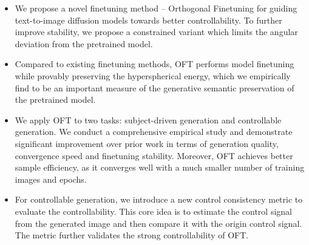 \begin{itemize}[leftmargin=*,nosep]
Both tasks essentially boil down to how to effectively finetune text-to-image diffusion models without losing the pretraining generative performance. We summarize the desiderata for an effective finetuning method as: (1) \emph{training efficiency}: having fewer trainable parameters and number of training epochs, and (2) \emph{generalizability preservation}: preserving the high-fidelity and diverse generative performance. To this end, finetuning is typically done either by updating the neuron weights by a small learning rate (\emph{e.g.}, \cite{ruiz2023dreambooth}) or by adding a small component with re-parameterized neuron weights (\emph{e.g.}, \cite{hulora2022,zhang2023adding}). Despite simplicity, neither finetuning strategy is able to guarantee the preservation of pretraining generative performance. There is also a lack of principled understanding towards designing a good finetuning strategy and finding suitable hyperparameters such as the number of training epochs. A key difficulty is the lack of a measure for quantifying the preservation of pretrained generative ability. Existing finetuning methods implicitly assume that a smaller Euclidean distance between the finetuned model and the pretrained model indicates better preservation of the pretrained ability. Due to the same reason, finetuning methods typically work with a very small learning rate. While this assumption may occasionally hold, we argue that the Euclidean difference to the pretrained model alone is unable to fully capture the degree of semantic preservation, and therefore a more structural measure to characterize the difference between the finetuned model and the pretrained model can greatly benefit the preservation of pretraining performance as well as finetuning stability. 

    \item We propose a novel finetuning method -- Orthogonal Finetuning for guiding text-to-image diffusion models towards better controllability. To further improve stability, we propose a constrained variant which limits the angular deviation from the pretrained model.
    \item Compared to existing finetuning methods, OFT performs model finetuning while provably preserving the hyperspherical energy, which we empirically find to be an important measure of the generative semantic preservation of the pretrained model.
    \item We apply OFT to two tasks: subject-driven generation and controllable generation. We conduct a comprehensive empirical study and demonstrate significant improvement over prior work in terms of generation quality, convergence speed and finetuning stability. Moreover, OFT achieves better sample efficiency, as it converges well with a much smaller number of training images and epochs.
    \item For controllable generation, we introduce a new control consistency metric to evaluate the controllability. This core idea is to estimate the control signal from the generated image and then compare it with the origin control signal. The metric further validates the strong controllability of OFT.
\end{itemize}

